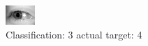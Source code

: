 \begin{figure}[h!]
\begin{center}
\includegraphics[width=0.60\columnwidth]{figures/ID3269_class_3_target_4.png}
\end{center}
\caption{ Classification: 3 actual target: 4}
\label{fig:ID3269_class_3_target_4}
\end{figure}
